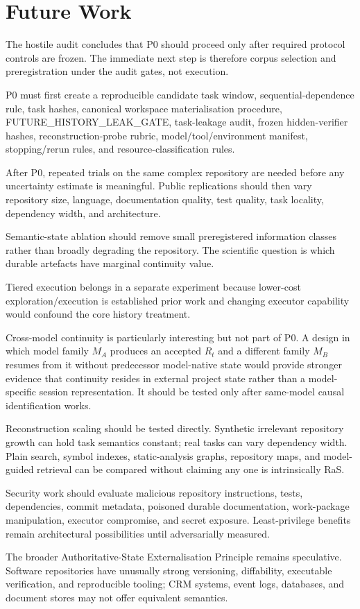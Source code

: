 \section{Future Work}
\label{sec:future}

The hostile audit concludes that P0 should proceed only after required protocol controls are frozen. The immediate next step is therefore corpus selection and preregistration under the audit gates, not execution.

P0 must first create a reproducible candidate task window, sequential-dependence rule, task hashes, canonical workspace materialisation procedure, FUTURE_HISTORY_LEAK_GATE, task-leakage audit, frozen hidden-verifier hashes, reconstruction-probe rubric, model/tool/environment manifest, stopping/rerun rules, and resource-classification rules.

After P0, repeated trials on the same complex repository are needed before any uncertainty estimate is meaningful. Public replications should then vary repository size, language, documentation quality, test quality, task locality, dependency width, and architecture.

Semantic-state ablation should remove small preregistered information classes rather than broadly degrading the repository. The scientific question is which durable artefacts have marginal continuity value.

Tiered execution belongs in a separate experiment because lower-cost exploration/execution is established prior work and changing executor capability would confound the core history treatment.

Cross-model continuity is particularly interesting but not part of P0. A design in which model family $M_A$ produces an accepted $R_t$ and a different family $M_B$ resumes from it without predecessor model-native state would provide stronger evidence that continuity resides in external project state rather than a model-specific session representation. It should be tested only after same-model causal identification works.

Reconstruction scaling should be tested directly. Synthetic irrelevant repository growth can hold task semantics constant; real tasks can vary dependency width. Plain search, symbol indexes, static-analysis graphs, repository maps, and model-guided retrieval can be compared without claiming any one is intrinsically RaS.

Security work should evaluate malicious repository instructions, tests, dependencies, commit metadata, poisoned durable documentation, work-package manipulation, executor compromise, and secret exposure. Least-privilege benefits remain architectural possibilities until adversarially measured.

The broader Authoritative-State Externalisation Principle remains speculative. Software repositories have unusually strong versioning, diffability, executable verification, and reproducible tooling; CRM systems, event logs, databases, and document stores may not offer equivalent semantics.
